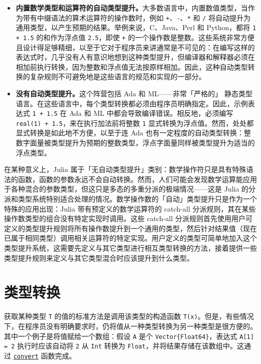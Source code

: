 \begin{itemize}
\item \textbf{内置数学类型和运算符的自动类型提升。}大多数语言中，内置数值类型，当作为带有中缀语法的算术运算符的操作数时，例如 \texttt{+}、\texttt{-}、\texttt{*} 和 \texttt{/} 将自动提升为通用类型，以产生预期的结果。举例来说，C、Java、Perl 和 Python，都将 \texttt{1 + 1.5} 的和作为浮点值 \texttt{2.5}，即使 \texttt{+} 的一个操作数是整数。这些系统非常方便且设计得足够精细，以至于它对于程序员来讲通常是不可见的：在编写这样的表达式时，几乎没有人有意识地想到这种类型提升，但编译器和解释器必须在相加前执行转换，因为整数和浮点值无法按原样相加。因此，这种自动类型转换的复杂规则不可避免地是这些语言的规范和实现的一部分。


\item \textbf{没有自动类型提升。}这个阵营包括 Ada 和 ML——非常「严格的」 静态类型语言。在这些语言中，每个类型转换都必须由程序员明确指定。因此，示例表达式 \texttt{1 + 1.5} 在 Ada 和 ML 中都会导致编译错误。相反地，必须编写 \texttt{real(1) + 1.5}，来在执行加法前将整数 \texttt{1} 显式转换为浮点值。然而，处处都显式转换是如此地不方便，以至于连 Ada 也有一定程度的自动类型转换：整数字面量被类型提升为预期的整数类型，浮点字面量同样被类型提升为适当的浮点类型。

\end{itemize}


在某种意义上，Julia 属于「无自动类型提升」类别：数学操作符只是具有特殊语法的函数，函数的参数永远不会自动转换。然而，人们可能会发现数学运算能应用于各种混合的参数类型，但这只是多态的多重分派的极端情况——这是 Julia 的分派和类型系统特别适合处理的情况。数学操作数的「自动」类型提升只是作为一个特殊的应用出现：Julia 带有预定义的数学运算符的 catch-all 分派规则，其在某些操作数类型的组合没有特定实现时调用。这些 catch-all 分派规则首先使用用户可定义的类型提升规则将所有操作数提升到一个通用的类型，然后针对结果值（现在已属于相同类型）调用相关运算符的特定实现。用户定义的类型可简单地加入这个类型提升系统，这需要先定义与其它类型进行相互类型转换的方法，接着提供一些类型提升规则来定义与其它类型混合时应该提升到什么类型。



\hypertarget{5183188243565893084}{}


\section{类型转换}



获取某种类型 \texttt{T} 的值的标准方法是调用该类型的构造函数 \texttt{T(x)}。但是，有些情况下，在程序员没有明确要求时，仍将值从一种类型转换为另一种类型是很方便的。其中一个例子是将值赋给一个数组：假设 \texttt{A} 是个 \texttt{Vector\{Float64\}}，表达式 \texttt{A[1] = 2} 执行时应该自动将 \texttt{2} 从 \texttt{Int} 转换为 \texttt{Float}，并将结果存储在该数组中。这通过 \hyperlink{1846942650946171605}{\texttt{convert}} 函数完成。



